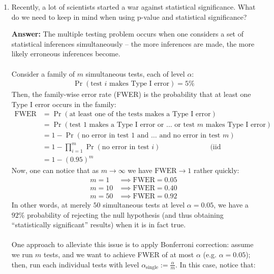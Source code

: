 \documentclass{article}
\newenvironment{QandA}{\begin{enumerate}[label=\arabic*.]}{\end{enumerate}}
\newenvironment{InnerQandA}{\begin{enumerate}[label=\roman*.]}{\end{enumerate}}
\newenvironment{answer}{\par\normalfont \textbf{Answer:}}{}
\begin{document}
\begin{QandA}
\begin{InnerQandA}
        \item Recently, a lot of scientists started a war against statistical significance. What do we need to keep in mind when using p-value and statistical significance?
        \begin{answer}
            The multiple testing problem occurs when one considers a set of statistical inferences simultaneously -- the more inferences are made, the more likely erroneous inferences become. \\\\
            Consider a family of $m$ simultaneous tests, each of level $\alpha$:
            \begin{align*}
                \Pr (\text{test } i \text{ makes Type I error}) = 5\%
            \end{align*}
            Then, the family-wise error rate (FWER) is the probability that at least one Type I error occurs in the family:
            \begin{align*}
                \text{FWER} &= \Pr (\text{at least one of the tests makes a Type I error}) \\
                &= \Pr(\text{test } 1 \text{ makes a Type I error or }\ldots \text{ or test } m \text{ makes Type I error}) \\
                &= 1 - \Pr(\text{no error in test } 1 \text{ and } \ldots \text{ and no error in test } m) \\
                &= 1 - \prod_{i=1}^m \Pr(\text{no error in test } i) & \text{(iid assumption)}\\
                &= 1 - (0.95)^m 
            \end{align*}
            Now, one can notice that as $m \rightarrow \infty$ we have $\text{FWER} \rightarrow 1$ rather quickly:
            \begin{align*}
                m = 1 &\implies \text{FWER} = 0.05 \\
                m = 10 &\implies \text{FWER} = 0.40 \\
                m = 50 &\implies \text{FWER} = 0.92
            \end{align*}
            In other words, at merely $50$ simultaneous tests at level $\alpha=0.05$, we have a $92\%$ probability of rejecting the null hypothesis (and thus obtaining ``statistically significant'' results) when it is in fact true.\\\\
            One approach to alleviate this issue is to apply Bonferroni correction: assume we run $m$ tests, and we want to achieve FWER of at most $\alpha$ (e.g. $\alpha=0.05$); then, run each individual tests with level $\alpha_{\text{single}}:= \frac{\alpha}{m}$. In this case, notice that:

\end{answer}
\end{InnerQandA}
\end{QandA}
\end{document}
